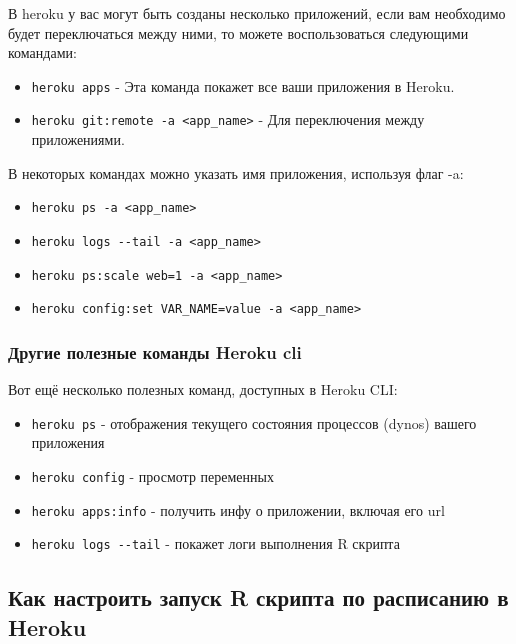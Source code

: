 \documentclass[
]{book}
\providecommand{\tightlist}{%
  \setlength{\itemsep}{0pt}\setlength{\parskip}{0pt}}
\begin{document}
В heroku у вас могут быть созданы несколько приложений, если вам необходимо будет переключаться между ними, то можете воспользоваться следующими командами:

\begin{itemize}
\tightlist
\item
  \texttt{heroku\ apps} - Эта команда покажет все ваши приложения в Heroku.
\item
  \texttt{heroku\ git:remote\ -a\ \textless{}app\_name\textgreater{}} - Для переключения между приложениями.
\end{itemize}

В некоторых командах можно указать имя приложения, используя флаг -a:

\begin{itemize}
\tightlist
\item
  \texttt{heroku\ ps\ -a\ \textless{}app\_name\textgreater{}}
\item
  \texttt{heroku\ logs\ -\/-tail\ -a\ \textless{}app\_name\textgreater{}}
\item
  \texttt{heroku\ ps:scale\ web=1\ -a\ \textless{}app\_name\textgreater{}}
\item
  \texttt{heroku\ config:set\ VAR\_NAME=value\ -a\ \textless{}app\_name\textgreater{}}
\end{itemize}

\subsubsection{Другие полезные команды Heroku cli}\label{ux434ux440ux443ux433ux438ux435-ux43fux43eux43bux435ux437ux43dux44bux435-ux43aux43eux43cux430ux43dux434ux44b-heroku-cli}

Вот ещё несколько полезных команд, доступных в Heroku CLI:

\begin{itemize}
\tightlist
\item
  \texttt{heroku\ ps} - отображения текущего состояния процессов (dynos) вашего приложения
\item
  \texttt{heroku\ config} - просмотр переменных
\item
  \texttt{heroku\ apps:info} - получить инфу о приложении, включая его url
\item
  \texttt{heroku\ logs\ -\/-tail} - покажет логи выполнения R скрипта
\end{itemize}

\subsection{Как настроить запуск R скрипта по расписанию в Heroku}\label{ux43aux430ux43a-ux43dux430ux441ux442ux440ux43eux438ux442ux44c-ux437ux430ux43fux443ux441ux43a-r-ux441ux43aux440ux438ux43fux442ux430-ux43fux43e-ux440ux430ux441ux43fux438ux441ux430ux43dux438ux44e-ux432-heroku}
\end{document}
